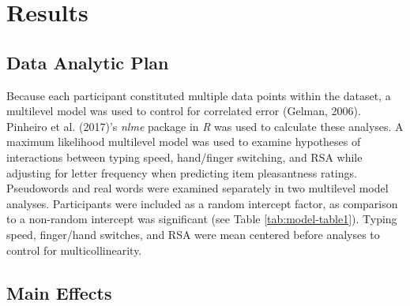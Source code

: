 \documentclass[
  english,
  man,mask]{apa7}
\begin{document}
\hypertarget{results}{%
\section{Results}\label{results}}

\hypertarget{data-analytic-plan}{%
\subsection{Data Analytic Plan}\label{data-analytic-plan}}

Because each participant constituted multiple data points within the dataset, a multilevel model was used to control for correlated error (Gelman, 2006). Pinheiro et al. (2017)'s \emph{nlme} package in \emph{R} was used to calculate these analyses. A maximum likelihood multilevel model was used to examine hypotheses of interactions between typing speed, hand/finger switching, and RSA while adjusting for letter frequency when predicting item pleasantness ratings. Pseudowords and real words were examined separately in two multilevel model analyses. Participants were included as a random intercept factor, as comparison to a non-random intercept was significant (see Table \ref{tab:model-table1}). Typing speed, finger/hand switches, and RSA were mean centered before analyses to control for multicollinearity.

\hypertarget{main-effects}{%
\subsection{Main Effects}\label{main-effects}}
\end{document}
